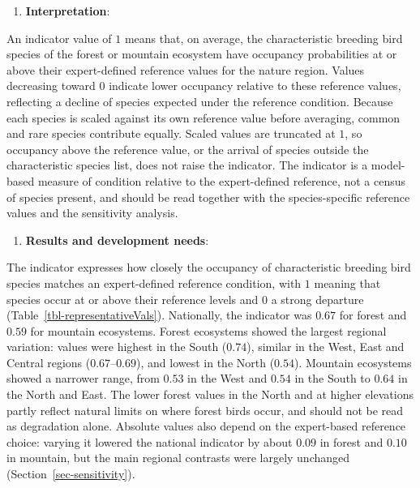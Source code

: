 \documentclass[
  letterpaper,
  DIV=11,
  numbers=noendperiod]{scrartcl}
\providecommand{\tightlist}{%
  \setlength{\itemsep}{0pt}\setlength{\parskip}{0pt}}
\begin{document}
\begin{enumerate}
\def\labelenumi{\arabic{enumi}.}
\setcounter{enumi}{2}
\tightlist
\item
  \textbf{Interpretation}:
\end{enumerate}

An indicator value of \(1\) means that, on average, the characteristic
breeding bird species of the forest or mountain ecosystem have occupancy
probabilities at or above their expert-defined reference values for the
nature region. Values decreasing toward \(0\) indicate lower occupancy
relative to these reference values, reflecting a decline of species
expected under the reference condition. Because each species is scaled
against its own reference value before averaging, common and rare
species contribute equally. Scaled values are truncated at \(1\), so
occupancy above the reference value, or the arrival of species outside
the characteristic species list, does not raise the indicator. The
indicator is a model-based measure of condition relative to the
expert-defined reference, not a census of species present, and should be
read together with the species-specific reference values and the
sensitivity analysis.

\begin{enumerate}
\def\labelenumi{\arabic{enumi}.}
\setcounter{enumi}{3}
\tightlist
\item
  \textbf{Results and development needs}:
\end{enumerate}

The indicator expresses how closely the occupancy of characteristic
breeding bird species matches an expert-defined reference condition,
with \(1\) meaning that species occur at or above their reference levels
and \(0\) a strong departure (Table~\ref{tbl-representativeVals}).
Nationally, the indicator was \(0.67\) for forest and \(0.59\) for
mountain ecosystems. Forest ecosystems showed the largest regional
variation: values were highest in the South (\(0.74\)), similar in the
West, East and Central regions (\(0.67\)--\(0.69\)), and lowest in the
North (\(0.54\)). Mountain ecosystems showed a narrower range, from
\(0.53\) in the West and \(0.54\) in the South to \(0.64\) in the North
and East. The lower forest values in the North and at higher elevations
partly reflect natural limits on where forest birds occur, and should
not be read as degradation alone. Absolute values also depend on the
expert-based reference choice: varying it lowered the national indicator
by about \(0.09\) in forest and \(0.10\) in mountain, but the main
regional contrasts were largely unchanged
(Section~\ref{sec-sensitivity}).
\end{document}
